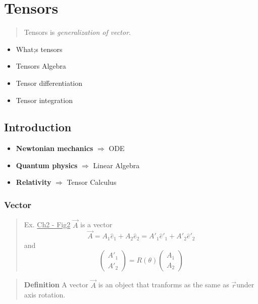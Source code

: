 \section{Tensors} %

\begin{quote}
	Tensors is \textit{generalization of vector}.
\end{quote}

\begin{itemize}
	\item What;s tensors
	\item Tensors Algebra
	\item Tensor differentiation
	\item Tensor integration

\end{itemize}
\subsection{Introduction} %

\begin{itemize}
	\item \textbf{Newtonian mechanics} $\Rightarrow$ ODE
	\item \textbf{Quantum physics} $\Rightarrow$ Linear Algebra
	\item \textbf{Relativity} $\Rightarrow$ Tensor Calculus

\end{itemize}
\subsubsection{Vector} %

\begin{quote}
	Ex.
\underline{Ch2 - Fig2}
$\vec{A}$ is a vector
\begin{equation}
\vec{A} = A_1\hat{e}_1 + A_2 \hat{e}_2 = A'_1\hat{e}'_1 + A'_2 \hat{e}'_2
\end{equation}
and
\begin{equation}
\begin{pmatrix}
A'_1\\A'_2
\end{pmatrix}
=
R(\theta)
\begin{pmatrix}
A_1\\A_2
\end{pmatrix}
\end{equation}

\end{quote}
\begin{quote}
	\textbf{Definition}
A vector $\vec{A}$ is an object that tranforms as the same as $\vec{r}$​ under axis rotation.
\end{quote}

